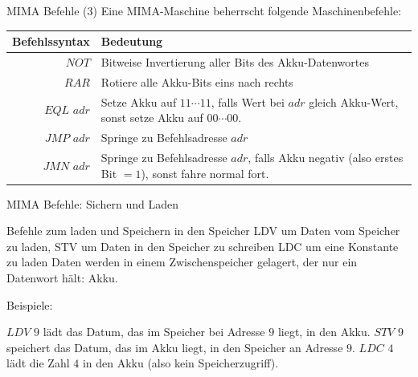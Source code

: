 \documentclass[handout]{beamer}
\begin{document}
\begin{frame}{MIMA Befehle (3)}
	Eine MIMA-Maschine beherrscht folgende Maschinenbefehle:
	
	\vspace{.5cm}
	
	\begin{tabular}{r | p{8cm} }
		Befehlssyntax & Bedeutung\\\hline\hline \ip
		$NOT$ & Bitweise Invertierung aller Bits des Akku-Datenwortes\\\hline\ip
		$RAR$ & Rotiere alle Akku-Bits eins nach rechts\\\hline\ip
		$EQL$ $adr$ & Setze Akku auf $11\cdots11$, falls Wert bei $adr$ gleich Akku-Wert, sonst setze Akku auf $00\cdots00$.\\\hline\ip
		$JMP$ $adr$ & Springe zu Befehlsadresse $adr$\\\hline\ip
		$JMN$ $adr$ & Springe zu Befehlsadresse $adr$, falls Akku negativ (also erstes Bit $=1$), sonst fahre normal fort.
	\end{tabular}
\end{frame}


\begin{frame}{MIMA Befehle: Sichern und Laden}
	\begin{itemize}
		\pitem Befehle zum laden und Speichern in den Speicher
		\pitem LDV um Daten vom Speicher zu laden, STV um Daten in den Speicher zu schreiben
		\pitem LDC um eine Konstante zu laden
		\pitem Daten werden in einem Zwischenspeicher gelagert, der nur ein Datenwort hält\ip : Akku.
	\end{itemize}

	\bp

	Beispiele:
	
	\begin{itemize}
		\pitem $LDV$ $9$ lädt das Datum, das im Speicher bei Adresse $9$ liegt, in den Akku.
		\pitem $STV$ $9$ speichert das Datum, das im Akku liegt, in den Speicher an Adresse $9$.
		\pitem $LDC$ $4$ lädt die Zahl $4$ in den Akku (also kein Speicherzugriff).
	\end{itemize}
\end{frame}
\end{document}
